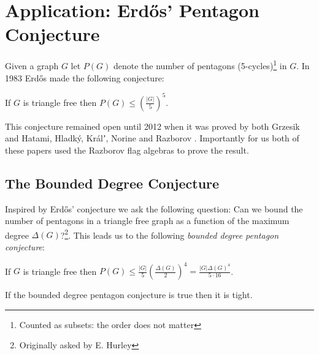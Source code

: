 \chapter{Application: Erd\H{o}s' Pentagon Conjecture}
\label{chap:pentagon_conjecture}

Given a graph $G$ let $P(G)$ denote the number of pentagons (5-cycles)\footnote{Counted as
subsets: the order does not matter} in $G$.
In 1983 \cite{erdosProblemsGraphTheory1984} Erd\H{o}s made the following conjecture:

\begin{knownconjecture}
    If $G$ is triangle free then $P(G) \leq \left(\frac{|G|}{5}\right)^5$.
\end{knownconjecture}

This conjecture remained open until 2012 when it was proved by both Grzesik
\cite{grzesikMaximumNumberFivecycles2012} and Hatami, Hladký, Králʼ, Norine and Razborov
\cite{hatamiNumberPentagonsTrianglefree2013}. 
Importantly for us both of these papers used the Razborov flag algebras to prove the result.

\section{The Bounded Degree Conjecture}

Inspired by Erd\H{o}s' conjecture we ask
the following question: Can we bound the number of pentagons in a triangle free graph
as a function of the maximum degree $\Delta(G)$?\footnote{Originally asked by E. Hurley}.
This leads us to the following \textit{bounded degree pentagon conjecture}:

\begin{conjecture}
    \label{conj:bounded_pentagon}
    If $G$ is triangle free then 
    $P(G) \leq \frac{|G|}{5}\left(\frac{\Delta(G)}{2}\right)^4
    =\frac{|G|\Delta(G)^4}{5\cdot 16}$.
\end{conjecture}

\begin{lemma}
    If the bounded degree pentagon conjecture is true then it is tight.
\end{lemma}

